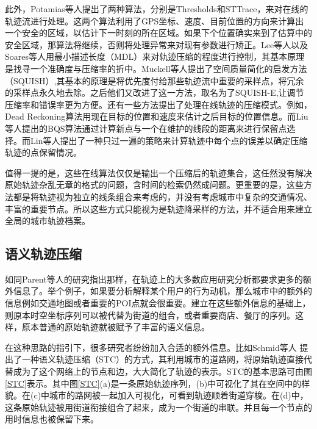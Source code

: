 此外，Potamias等人\cite{potamias2006sampling}提出了两种算法，分别是Thresholds和STTrace，来对在线的轨迹流进行处理。这两个算法利用了GPS坐标、速度、目前位置的方向来计算出一个安全的区域，以估计下一时刻的所在区域。如果下个位置确实来到了估算中的安全区域，那算法将继续，否则将处理异常来对现有参数进行矫正。Lee等人\cite{lee2007trajectory}以及Soares等人\cite{soares2015grasp}用最小描述长度（MDL）来对轨迹压缩的程度进行控制，其基本原理是找寻一个准确度与压缩率的折中。Muckell等人提出了空间质量简化的启发方法（SQUISH）,其基本的原理是将优先度付给那些轨迹流中重要的采样点，将冗余的采样点永久地去除。之后他们又改进了这一方法，取名为了SQUISH-E,让调节压缩率和错误率更为方便\cite{muckell2014compression}。还有一些方法提出了处理在线轨迹的压缩模式。例如，Dead Reckoning算法用现在目标的位置和速度来估计之后目标的位置信息\cite{trajcevski2006line}。而Liu等人\cite{liu2015bounded}提出的BQS算法通过计算新点与一个在维护的线段的距离来进行保留点选择。而Lin等人\cite{lin2017one}提出了一种只过一遍的策略来计算轨迹中每个点的误差以确定压缩轨迹的点保留情况。

值得一提的是，这些在线算法仅仅是输出一个压缩后的轨迹集合，这任然没有解决原始轨迹杂乱无章的格式的问题，含时间的检索仍然成问题。更重要的是，这些方法都是将轨迹视为独立的线条组合来考虑的，并没有考虑城市中复杂的交通情况、丰富的重要节点。所以这些方式只能视为是轨迹降采样的方法，并不适合用来建立全局的城市轨迹档案。


\subsection{语义轨迹压缩}
如同Parent等人的研究指出那样，在轨迹上的大多数应用研究分析都要求更多的额外信息了。举个例子，如果要分析解释某个用户的行为动机，那么城市中的额外的信息例如交通地图或者重要的POI点就会很重要。建立在这些额外信息的基础上，则原本时空坐标序列可以被代替为街道的组合，或者重要商店、餐厅的序列。这样，原本普通的原始轨迹就被赋予了丰富的语义信息。



在这种思路的指引下，很多研究者纷纷加入合适的额外信息。比如Schmid等人\cite{schmid2009semantic,richter2012semantic} 提出了一种语义轨迹压缩（STC）的方式，其利用城市的道路网，将原始轨迹直接代替成为了这个网络上的节点和边，大大简化了轨迹的表示。STC的基本思路可由图\ref{STC}表示。其中图\ref{STC}(a)是一条原始轨迹序列，(b)中可视化了其在空间中的样貌。在(c)中城市的路网被一起加入可视化，可看到轨迹顺着街道穿梭。在(d)中，这条原始轨迹被用街道衔接组合了起来，成为一个街道的串联。并且每一个节点的用时信息也被保留下来。


